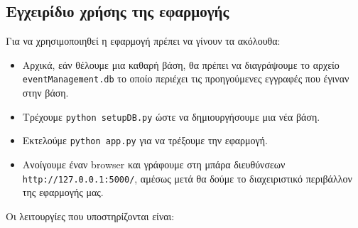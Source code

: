 \documentclass[a4paper, 11pt]{article}
\begin{document}
\subsection*{Εγχειρίδιο χρήσης της εφαρμογής}
Για να χρησιμοποιηθεί η εφαρμογή πρέπει να γίνουν τα ακόλουθα:
\begin{itemize}
	\item Αρχικά, εάν θέλουμε μια καθαρή βάση, θα πρέπει να διαγράψουμε το αρχείο \texttt{eventManagement.db} το οποίο περιέχει τις προηγούμενες εγγραφές που έγιναν στην βάση.
	\item Τρέχουμε \texttt{python setupDB.py} ώστε να δημιουργήσουμε μια νέα βάση.
	\item Εκτελούμε \texttt{python app.py} για να τρέξουμε την εφαρμογή.
	\item Ανοίγουμε έναν browser και γράφουμε στη μπάρα διευθύνσεων \texttt{http://127.0.0.1:5000/}, αμέσως μετά θα δούμε το διαχειριστικό περιβάλλον της εφαρμογής μας.
\end{itemize}
Οι λειτουργίες που υποστηρίζονται είναι:
\end{document}

